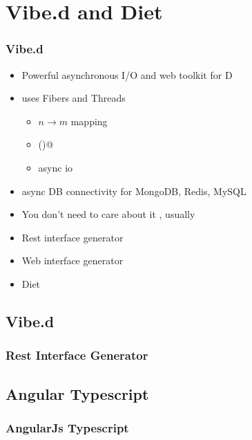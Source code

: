\documentclass[xelatex,13pt]{beamer}
\begin{document}
\section{Vibe.d and Diet}
\begin{frame}
	\frametitle{Vibe.d}
	\begin{itemize}
		\item Powerful asynchronous I/O and web toolkit for D
			\pause
		\item uses Fibers and Threads
			\pause
			\begin{itemize}
				\item \(n \rightarrow m\) mapping
					\pause
				\item \lstinline@yield()@
					\pause
				\item async io
			\end{itemize}
			\pause
		\item async DB connectivity for MongoDB, Redis, MySQL
			\pause
		\item You don't need to care about it%
			\pause , usually 
		\item Rest interface generator
			\pause
		\item Web interface generator
			\pause
		\item Diet
	\end{itemize}
\end{frame}

\subsection{Vibe.d}
\begin{frame}
	\frametitle{Rest Interface Generator}
	
	\pause
	
	\pause
	
\end{frame}

\subsection{Angular Typescript}
\begin{frame}
	\frametitle{AngularJs Typescript}
	
\end{frame}
\end{document}
